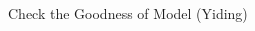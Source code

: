\documentclass[table]{beamer}\usepackage[]{graphicx}\usepackage[]{color}
\newenvironment{knitrout}{}{} %
\begin{document}
\begin{frame}{Check the Goodness of Model (Yiding)}
\begin{columns}[t]
\begin{column}[t]{7cm}
\begin{knitrout}
\end{knitrout}


\begin{table}[ht]
\centering
{}
\end{table}
\end{column}
\end{columns}

\end{frame}
\end{document}
